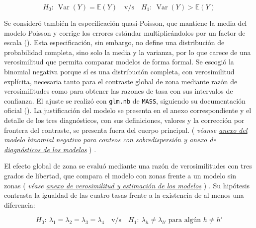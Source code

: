 \documentclass[
  spanish,
  letterpaper,
  DIV=11,
  numbers=noendperiod]{scrartcl}
\newcommand{\asesoriaParenRef}[1]{%
  \textnormal{\textcolor{asesoriaTextColor}{(}}%
  {\hypersetup{linkcolor=asesoriaLinkColor,urlcolor=asesoriaLinkColor,citecolor=asesoriaLinkColor}\textcolor{asesoriaTextColor}{\emph{#1}}}%
  \textnormal{\textcolor{asesoriaTextColor}{)}}%
}
\begin{document}
\begingroup
\setlength{\abovedisplayskip}{0pt}
\setlength{\belowdisplayskip}{0pt}
\setlength{\abovedisplayshortskip}{0pt}
\setlength{\belowdisplayshortskip}{0pt}
\vspace{-1.10em}
\[
H_0:\ \operatorname{Var}(Y)=\mathbb{E}(Y)
\quad \text{v/s} \quad
H_1:\ \operatorname{Var}(Y)>\mathbb{E}(Y)
\]
\vspace{-1.15em}
\endgroup

Se consideró también la especificación quasi-Poisson, que mantiene la
media del modelo Poisson y corrige los errores estándar multiplicándolos
por un factor de escala (). Esta especificación, sin embargo, no define una
distribución de probabilidad completa, sino solo la media y la varianza,
por lo que carece de una verosimilitud que permita comparar modelos de
forma formal. Se escogió la binomial negativa porque sí es una
distribución completa, con verosimilitud explícita, necesaria tanto para
el contraste global de zona mediante razón de verosimilitudes como para
obtener las razones de tasa con sus intervalos de confianza. El ajuste
se realizó con \texttt{glm.nb} de \texttt{MASS}, siguiendo su
documentación oficial (). La justificación del modelo se presenta en el anexo
correspondiente y el detalle de los tres diagnósticos, con sus
definiciones, valores y la corrección por frontera del contraste, se
presenta fuera del cuerpo principal.
\asesoriaParenRef{véanse \hyperref[sec-anexo-binomial-negativa]{anexo del modelo binomial negativo para conteos con sobredispersión} y \hyperref[sec-anexo-diagnosticos]{anexo de diagnósticos de los modelos}}.

El efecto global de zona se evaluó mediante una razón de verosimilitudes
con tres grados de libertad, que compara el modelo con zonas frente a un
modelo sin zonas
\asesoriaParenRef{véase \hyperref[sec-anexo-verosimilitud]{anexo de verosimilitud y estimación de los modelos}}.
Su hipótesis contrasta la igualdad de las cuatro tasas frente a la
existencia de al menos una diferencia:

\begingroup
\setlength{\abovedisplayskip}{0pt}
\setlength{\belowdisplayskip}{0pt}
\setlength{\abovedisplayshortskip}{0pt}
\setlength{\belowdisplayshortskip}{0pt}
\vspace{-1.10em}
\[
H_0:\ \lambda_{1}=\lambda_{2}=\lambda_{3}=\lambda_{4}
\quad \text{v/s} \quad
H_1:\ \lambda_{h}\neq\lambda_{h'} \ \text{para algún } h\neq h'
\]
\vspace{-1.15em}
\endgroup
\end{document}
